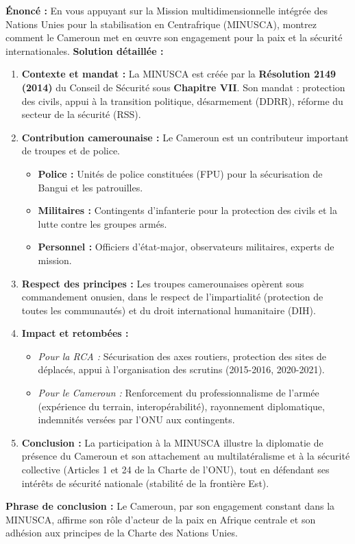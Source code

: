 \documentclass[11pt]{article}
\newcommand{\cle}[1]{{\popxbold\color{popdark}#1}}
\begin{document}
\begin{exoresolu}
    \textbf{Énoncé :} En vous appuyant sur la Mission multidimensionnelle intégrée des Nations Unies pour la stabilisation en Centrafrique (MINUSCA), montrez comment le Cameroun met en œuvre son engagement pour la paix et la sécurité internationales.
    \tcblower
    \textbf{Solution détaillée :}
    \begin{enumerate}
        \item \textbf{Contexte et mandat :} La MINUSCA est créée par la \textbf{Résolution 2149 (2014)} du Conseil de Sécurité sous \textbf{Chapitre VII}. Son mandat : protection des civils, appui à la transition politique, désarmement (DDRR), réforme du secteur de la sécurité (RSS).
        \item \textbf{Contribution camerounaise :} Le Cameroun est un contributeur important de troupes et de police.
            \begin{itemize}
                \item \textbf{Police :} Unités de police constituées (FPU) pour la sécurisation de Bangui et les patrouilles.
                \item \textbf{Militaires :} Contingents d'infanterie pour la protection des civils et la lutte contre les groupes armés.
                \item \textbf{Personnel :} Officiers d'état-major, observateurs militaires, experts de mission.
            \end{itemize}
        \item \textbf{Respect des principes :} Les troupes camerounaises opèrent sous commandement onusien, dans le respect de l'impartialité (protection de toutes les communautés) et du droit international humanitaire (DIH).
        \item \textbf{Impact et retombées :}
            \begin{itemize}
                \item \emph{Pour la RCA :} Sécurisation des axes routiers, protection des sites de déplacés, appui à l'organisation des scrutins (2015-2016, 2020-2021).
                \item \emph{Pour le Cameroun :} Renforcement du professionnalisme de l'armée (expérience du terrain, interopérabilité), rayonnement diplomatique, indemnités versées par l'ONU aux contingents.
            \end{itemize}
        \item \textbf{Conclusion :} La participation à la MINUSCA illustre la \cle{diplomatie de présence} du Cameroun et son attachement au \cle{multilatéralisme} et à la \cle{sécurité collective} (Articles 1 et 24 de la Charte de l'ONU), tout en défendant ses intérêts de sécurité nationale (stabilité de la frontière Est).
    \end{enumerate}
    \textbf{Phrase de conclusion :} Le Cameroun, par son engagement constant dans la MINUSCA, affirme son rôle d'acteur de la paix en Afrique centrale et son adhésion aux principes de la Charte des Nations Unies.
\end{exoresolu}
\end{document}
